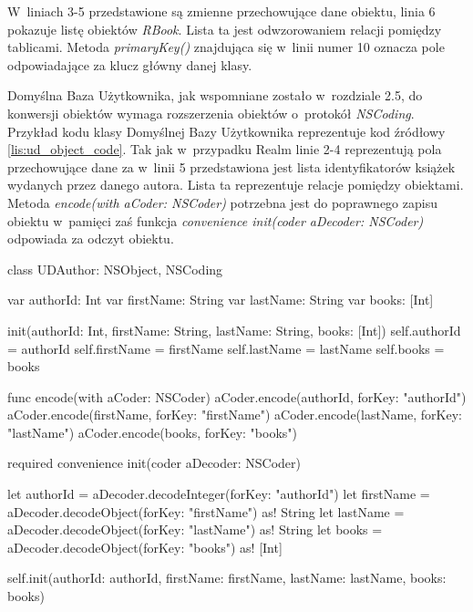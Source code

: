  W~liniach 3-5 przedstawione są zmienne przechowujące dane obiektu, linia 6 pokazuje listę obiektów \textit{RBook}. Lista ta jest odwzorowaniem relacji pomiędzy tablicami. Metoda \textit{primaryKey()} znajdująca się w~linii numer 10 oznacza pole odpowiadające za klucz główny danej klasy. 

Domyślna Baza Użytkownika, jak wspomniane zostało w~rozdziale 2.5, do konwersji obiektów wymaga rozszerzenia obiektów o~protokół \textit{NSCoding}. Przykład kodu klasy Domyślnej Bazy Użytkownika reprezentuje kod źródłowy \ref{lis:ud_object_code}. Tak jak w~przypadku Realm linie 2-4 reprezentują pola przechowujące dane za w~linii 5 przedstawiona jest lista identyfikatorów książek wydanych przez danego autora. Lista ta reprezentuje relacje pomiędzy obiektami. Metoda \textit{encode(with aCoder: NSCoder)} potrzebna jest do poprawnego zapisu obiektu w~pamięci zaś funkcja \textit{convenience init(coder aDecoder: NSCoder)} odpowiada za odczyt obiektu.

\begin{code}[
		language=swift,
		caption={Przykład obiektu Domyślnej Bazy Użytkownika},
		label={lis:ud_object_code},
	]
class UDAuthor: NSObject, NSCoding {
    var authorId: Int
    var firstName: String
    var lastName: String
    var books: [Int]
    
    init(authorId: Int, firstName: String, lastName: String, books: [Int]) {
        self.authorId = authorId
        self.firstName = firstName
        self.lastName = lastName
        self.books = books
    }
    
    func encode(with aCoder: NSCoder) {
        aCoder.encode(authorId, forKey: "authorId")
        aCoder.encode(firstName, forKey: "firstName")
        aCoder.encode(lastName, forKey: "lastName")
        aCoder.encode(books, forKey: "books")
    }
    
    required convenience init(coder aDecoder: NSCoder) {
        let authorId = aDecoder.decodeInteger(forKey: "authorId")
        let firstName = aDecoder.decodeObject(forKey: "firstName") as! String
        let lastName = aDecoder.decodeObject(forKey: "lastName") as! String
        let books = aDecoder.decodeObject(forKey: "books") as! [Int]
        
        self.init(authorId: authorId, firstName: firstName, lastName: lastName, books: books)
    }
}

\end{code}
\bigskip

